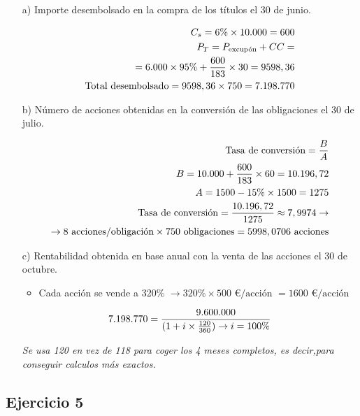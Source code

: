 \begin{enumerate}
    \item[a)] Importe desembolsado en la compra de los títulos el 30 de junio.
    
    \begin{align*}
        C_s = 6\% \times 10\text{.}000 = 600 \\
        P_T = P_{\text{excupón}} + CC = \\
        = 6\text{.}000 \times 95\% + \frac{600}{183} \times 30 = 9598,36 \\
        \text{Total desembolsado} = 9598,36 \times 750 = 7\text{.}198\text{.}770
    \end{align*}

    \item[b)] Número de acciones obtenidas en la conversión de las obligaciones el 30 de julio.
    
    \begin{align*}
        \text{Tasa de conversión} = \frac{B}{A} \\
        B = 10\text{.}000 + \frac{600}{183} \times 60 = 10\text{.}196,72 \\
        A = 1500 - 15\% \times 1500 = 1275 \\
        \text{Tasa de conversión} = \frac{10\text{.}196,72}{1275} \approx 7,9974 \rightarrow \\ \rightarrow 8 \text{ acciones/obligación} \times 750 \text{ obligaciones}= 5998, 0706 \text{ acciones}
\end{align*}

    \item[c)] Rentabilidad obtenida en base anual con la venta de las acciones el 30 de octubre.
    
    \begin{itemize}
        \item Cada acción se vende a 320\% $\rightarrow 320\% \times 500 \text{ €/acción } = 1600 \text{ €/acción}$
    \end{itemize}

    \begin{align*}
        7\text{.}198\text{.}770 = \frac{9\text{.}600\text{.}000}{(1 + i \times \frac{120}{360}) \rightarrow i = 100\%}
    \end{align*}

    \textit{Se usa 120 en vez de 118 para coger los 4 meses completos, es decir,para conseguir calculos más exactos.}

\end{enumerate}


\subsection*{Ejercicio 5}

